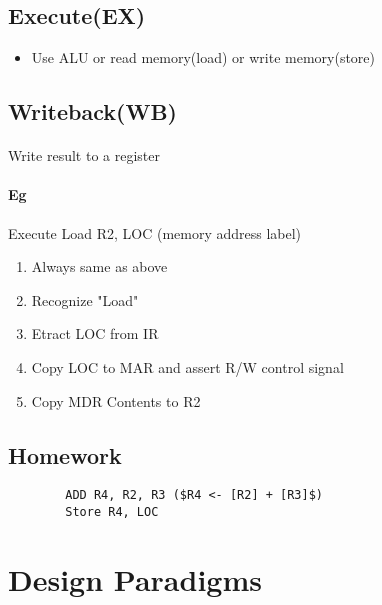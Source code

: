 \documentclass[12pt]{report}
\begin{document}
    \subsection{Execute(EX)}
      \begin{itemize}
        \item Use ALU or read memory(load) or write memory(store)
      \end{itemize}
    \subsection{Writeback(WB)}
      \paragraph{} Write result to a register
      \paragraph{Eg} Execute Load R2, LOC (memory address label)
      \begin{enumerate}
        \item Always same as above
        \item Recognize "Load"
        \item Etract LOC from IR
        \item Copy LOC to MAR and assert R/W control signal
        \item Copy MDR Contents to R2
      \end{enumerate}

    \subsection{Homework}
      \begin{lstlisting}
        ADD R4, R2, R3 ($R4 <- [R2] + [R3]$)
        Store R4, LOC
      \end{lstlisting}

  \section{Design Paradigms}
\end{document}
